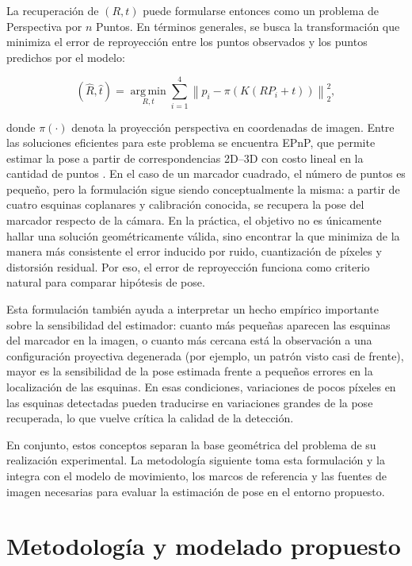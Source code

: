 \documentclass[12pt,a4paper]{report}
\begin{document}
La recuperación de \((R,t)\) puede formularse entonces como un problema de
Perspectiva por \(n\) Puntos. En términos generales, se busca la transformación
que minimiza el error de reproyección entre los puntos observados y los puntos
predichos por el modelo:

\begin{equation}
(\hat{R},\hat{t}) =
\operatorname*{arg\,min}_{R,t}
\sum_{i=1}^{4}
\left\|
p_i - \pi\!\left(K(RP_i + t)\right)
\right\|_2^2,
\label{eq:pnp_optimization}
\end{equation}

donde \(\pi(\cdot)\) denota la proyección perspectiva en coordenadas de imagen.
Entre las soluciones eficientes para este problema se encuentra EPnP, que
permite estimar la pose a partir de correspondencias 2D--3D con costo lineal en
la cantidad de puntos \citep{Lepetit2009}. En el caso de un marcador cuadrado,
el número de puntos es pequeño, pero la formulación sigue siendo conceptualmente
la misma: a partir de cuatro esquinas coplanares y calibración conocida, se
recupera la pose del marcador respecto de la cámara. En la práctica, el objetivo
no es únicamente hallar una solución geométricamente válida, sino encontrar la
que minimiza de la manera más consistente el error inducido por ruido,
cuantización de píxeles y distorsión residual. Por eso, el error de
reproyección funciona como criterio natural para comparar hipótesis de pose.

Esta formulación también ayuda a interpretar un hecho empírico importante sobre
la sensibilidad del estimador: cuanto más pequeñas aparecen las esquinas del
marcador en la imagen, o cuanto más cercana está la observación a una
configuración proyectiva degenerada (por ejemplo, un patrón visto casi de
frente), mayor es la sensibilidad de la pose estimada frente a pequeños errores
en la localización de las esquinas. En esas condiciones, variaciones de pocos
píxeles en las esquinas detectadas pueden traducirse en variaciones grandes de la
pose recuperada, lo que vuelve crítica la calidad de la detección.

En conjunto, estos conceptos separan la base geométrica del problema de su
realización experimental. La metodología siguiente toma esta formulación y la
integra con el modelo de movimiento, los marcos de referencia y las fuentes de
imagen necesarias para evaluar la estimación de pose en el entorno propuesto.


\chapter{Metodología y modelado propuesto} \label{sec:metodologia}
\end{document}
